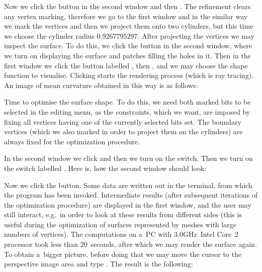 
\newpage
Now we click the  button in the second window and then
. The refinement clears any vertex marking, therefore we
go to the first window and in the similar way we mark the vertices and then
we project them onto two cylinders, but this time we choose the cylinder
radius $0.9267795297$. After projecting the vertices we may inspect the
surface. To do this, we click the  button in the second window,
where we turn on displaying the surface and patches filling the holes in it.
Then in the first window we click the button labelled , then
, and we may choose the shape function to visualise.
Clicking  starts the rendering process (which is ray
tracing). An image of mean curvature obtained in this way is as follows:


Time to optimise the surface shape. To do this, we need both marked bits to
be selected in the editing menu, as the constraints, which we want, are
imposed by fixing all vertices having one of the currently selected bits
set. The boundary vertices (which we also marked in order to project them on
the cylinders) are always fixed for the optimization procedure.

\newpage
In the second window we click  and then we turn on the
 switch. Then we turn on the switch labelled
. Here is, how the second window should look:


\newpage
Now we click the  button. Some data are written out in the
terminal, from which the program has been invoked. Intermediate results
(after subsequent iterations of the optimization procedure) are displayed
in the first window, and the user may still interact, e.g.\ in order to
look at these results from different sides (this is useful during the
optimization of surfaces represented by meshes with large numbers of
vertices). The computations on a~PC with
3.0GHz~Intel Core~2 processor took less than 20~seconds, after which we may
render the surface again. To obtain a~bigger picture, before doing that we may
move the cursor to the perspective image area and type . The result
is the following:


